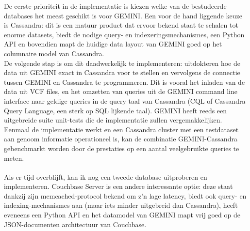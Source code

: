\documentclass{article}
\begin{document}
De eerste prioriteit in de implementatie is kiezen welke van de bestudeerde databases het meest geschikt is voor GEMINI. Een voor de hand liggende keuze is Cassandra: dit is een matuur product dat ervoor bekend staat te schalen tot enorme datasets, biedt de nodige query- en indexeringsmechanismes, een Python API en bovendien mapt de huidige data layout van GEMINI goed op het columnaire model van Cassandra.\\
De volgende stap is om dit daadwerkelijk te implementeren: uitdokteren hoe de data uit GEMINI exact in Cassandra voor te stellen en vervolgens de connectie tussen GEMINI en Cassandra te programmeren. Dit is vooral het inladen van de data uit VCF files, en het omzetten van queries uit de GEMINI command line interface naar geldige queries in de query taal van Cassandra (CQL of Cassandra Query Language, een sterk op SQL lijkende taal). GEMINI heeft reeds een uitgebreide suite unit-tests die de implementatie zullen vergemakkelijken.
Eenmaal de implementatie werkt en een Cassandra cluster met een testdataset aan genoom informatie operationeel is, kan de combinatie GEMINI-Cassandra gebenchmarkt worden door de prestaties op een aantal veelgebruikte queries te meten.\\\\
Als er tijd overblijft, kan ik nog een tweede database uitproberen en implementeren. Couchbase Server is een andere interessante optie: deze staat dankzij zijn memcached-protocol bekend om z'n lage latency, biedt ook query- en indexing-mechanismes aan (maar iets minder uitgebreid dan Cassandra), heeft eveneens een Python API en het datamodel van GEMINI mapt vrij goed op de JSON-documenten architectuur van Couchbase.

\begin{landscape}

\end{landscape}

{}

\end{document}
